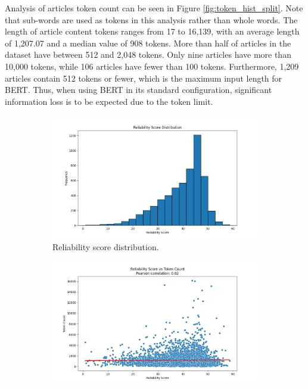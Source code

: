 Analysis of articles token count can be seen in Figure \ref{fig:token_hist_split}. Note that sub-words are used as tokens in this analysis rather than whole words. The length of article content tokens ranges from 17 to 16,139, with an average length of 1,207.07 and a median value of 908 tokens. More than half of articles in the dataset have between 512 and 2,048 tokens. Only nine articles have more than 10,000 tokens, while 106 articles have fewer than 100 tokens. Furthermore, 1,209 articles contain 512 tokens or fewer, which is the maximum input length for BERT. Thus, when using BERT in its standard configuration, significant information loss is to be expected due to the token limit.

\begin{figure}[htbp]
    \centering
    \begin{subfigure}{0.49\linewidth}
        \includegraphics[width=1\linewidth]{figures/reliability_score_hist.png}
        \caption{Reliability score distribution.}
        \label{fig:reliability_score_hist}
    \end{subfigure}
    \begin{subfigure}{0.49\linewidth}
        \includegraphics[width=1\linewidth]{figures/correlation_token_reliability_score.png}

\end{subfigure}
\end{figure}
